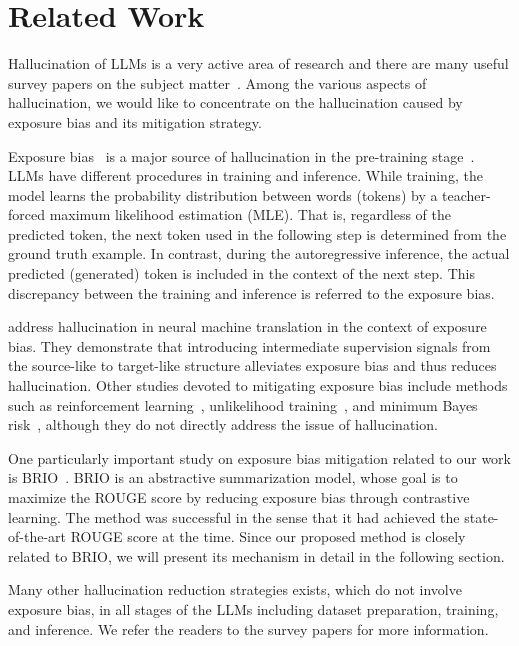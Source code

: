 \section{Related Work}
Hallucination of LLMs is a very active area of research and there are many useful survey papers on the subject matter~\cite{ji2023survey, zhang2023siren, rawte2023survey, huang2023survey, tonmoy2024comprehensive}.
Among the various aspects of hallucination, we would like to concentrate on the hallucination caused by exposure bias and its mitigation strategy.

Exposure bias~\cite{bengio2015scheduled, ranzato2016sequence} is a major source of hallucination in the pre-training stage~\cite{wang2020exposure}. 
LLMs have different procedures in training and inference. 
While training, the model learns the probability distribution between words (tokens) by a teacher-forced maximum likelihood estimation (MLE).
That is, regardless of the predicted token, the next token used in the following step is determined from the ground truth example. 
In contrast, during the autoregressive inference, the actual predicted (generated) token is included in the context of the next step.
This discrepancy between the training and inference is referred to the exposure bias. 

\citet{wang2023progressive} address hallucination in neural machine translation in the context of exposure bias. 
They demonstrate that introducing intermediate supervision signals from the source-like to target-like structure alleviates exposure bias and thus reduces hallucination. 
Other studies devoted to mitigating exposure bias include methods such as reinforcement learning~\cite{chen2019reinforcement}, unlikelihood training~\cite{welleck2019neural}, and minimum Bayes risk~\cite{bertsch2023s}, although they do not directly address the issue of hallucination.

One particularly important study on exposure bias mitigation related to our work is BRIO~\cite{liu2022brio}.
BRIO is an abstractive summarization model, whose goal is to maximize the ROUGE score by reducing exposure bias through contrastive learning.
The method was successful in the sense that it had achieved the state-of-the-art ROUGE score at the time. 
Since our proposed method is closely related to BRIO, we will present its mechanism in detail in the following section. 

Many other hallucination reduction strategies exists, which do not involve exposure bias, in all stages of the LLMs including dataset preparation, training, and inference.
We refer the readers to the survey papers for more information.
